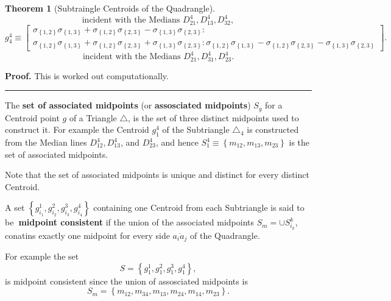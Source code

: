 \documentclass{unswthesis}
\newtheorem{theorem}{Theorem}
\newenvironment{proof}[1][Proof]{\noindent\textbf{#1.} }{\ \rule{0.5em}{0.5em}}
\begin{document}
\begin{theorem}[Subtraingle Centroids of the Quadrangle]
\begin{equation*}
\text{incident with the Medians }D_{21}^{4},D_{13}^{4},D_{32}^{4}, 
\end{equation*}%
\begin{equation*}
g_{4}^{4}\equiv \left[ 
\begin{array}{c}
\sigma _{\left\{ 1,2\right\} }\sigma _{\left\{ 1,3\right\} }+\sigma
_{\left\{ 1,2\right\} }\sigma _{\left\{ 2,3\right\} }-\sigma _{\left\{
1,3\right\} }\sigma _{\left\{ 2,3\right\} }: \\ 
\sigma _{\left\{ 1,2\right\} }\sigma _{\left\{ 1,3\right\} }+\sigma
_{\left\{ 1,2\right\} }\sigma _{\left\{ 2,3\right\} }+\sigma _{\left\{
1,3\right\} }\sigma _{\left\{ 2,3\right\} }:\sigma _{\left\{ 1,2\right\}
}\sigma _{\left\{ 1,3\right\} }-\sigma _{\left\{ 1,2\right\} }\sigma
_{\left\{ 2,3\right\} }-\sigma _{\left\{ 1,3\right\} }\sigma _{\left\{
2,3\right\} }%
\end{array}%
\right] . 
\end{equation*}%
\begin{equation*}
\text{incident with the Medians }D_{21}^{4},D_{31}^{4},D_{23}^{4}. 
\end{equation*}
\end{theorem}

\begin{proof}
This is worked out computationally.
\end{proof}

\bigskip

The \textbf{set of associated midpoints} (or \textbf{assosciated midpoints}) 
$S_{g}$ for a Centroid point $g$ of a Triangle $\triangle $, is the set of
three distinct midpoints used to construct it. For example the Centroid $%
g_{1}^{4}$ of the Subtriangle $\triangle _{4}$ is constructed from the
Median lines $D_{12}^{4},D_{13}^{4}$, and $D_{23}^{4}$, and hence $%
S_{1}^{4}\equiv \left\{ m_{12},m_{13},m_{23}\right\} $ is the set of
associated midpoints.

Note that the set of associated midpoints is unique and distinct for every
distinct Centroid.

A set $\left\{
g_{i_{1}}^{1},g_{i_{2}}^{2},g_{i_{3}}^{3},g_{i_{4}}^{4}\right\} $ containing
one Centroid from each Subtriangle is said to be\textbf{\ midpoint consistent%
} if the union of the associated midpoints $S_{m}=\cup S_{i_{k}}^{k}$,
conatins exactly one midpoint for every side $\overline{a_{i}a_{j}}$ of the
Quadrangle.

For example the set%
\begin{equation*}
S=\left\{ g_{1}^{1},g_{1}^{2},g_{1}^{3},g_{1}^{4}\right\} , 
\end{equation*}%
is midpoint consistent since the union of assosciated midpoints is%
\begin{equation*}
S_{m}=\left\{ m_{12},m_{34},m_{13},m_{24},m_{14},m_{23}\right\} . 
\end{equation*}
\end{document}
